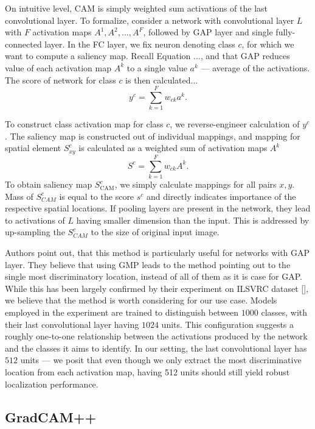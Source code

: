 On intuitive level, CAM is simply weighted sum activations of the last convolutional layer. To formalize, consider a network with convolutional layer $L$ with $F$ activation maps $A^1, A^2, ..., A^F$, followed by GAP layer and single fully-connected layer. In the FC layer, we fix neuron denoting class $c$, for which we want to compute a saliency map. Recall Equation ..., and that GAP reduces value of each activation map $A^k$ to a single value $a^k$ --- average of the activations. The score of network for class $c$ is then calculated...
\begin{equation}
    y^c = \sum_{k=1}^F w_{ck}  a^k.
\end{equation}

To construct class activation map for class $c$, we reverse-engineer calculation of $y^c$. The saliency map is constructed out of individual mappings, and mapping for spatial element $S^c_{xy}$ is calculated as a weighted sum of activation maps $A^k$
\begin{equation}
    S^c = \sum_{k=1}^F w_{ck}  A^k.
\end{equation}
To obtain saliency map $S^c_{\text{CAM}}$, we simply calculate mappings for all pairs $x, y$. Mass of $S^c_{CAM}$ is equal to the score $s^c$ and directly indicates importance of the respective spatial locations. If pooling layers are present in the network, they lead to activations of $L$ having smaller dimension than the input. This is addressed by up-sampling the $S^c_{CAM}$ to the size of original input image.
\medskip


Authors point out, that this method is particularly useful for networks with GAP layer. They believe that using GMP leads to the method pointing out to the single most discriminatory location, instead of all of them as it is case for GAP. While this has been largely confirmed by their experiment on ILSVRC dataset [], we believe that the method is worth considering for our use case. Models employed in the experiment are trained to distinguish between $1000$ classes, with their last convolutional layer having $1024$ units. This configuration suggests a roughly one-to-one relationship between the activations produced by the network and the classes it aims to identify. In our setting, the last convolutional layer has $512$ units --- we posit that even though we only extract the most discriminative location from each activation map, having 512 units should still yield robust localization performance.

\subsection{GradCAM++}

